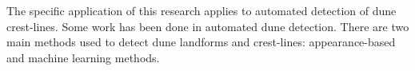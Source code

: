 

The specific application of this research applies to automated detection of dune crest-lines. Some work has been done in automated dune detection. There are two main methods used to detect dune landforms and crest-lines: appearance-based and machine learning methods.


